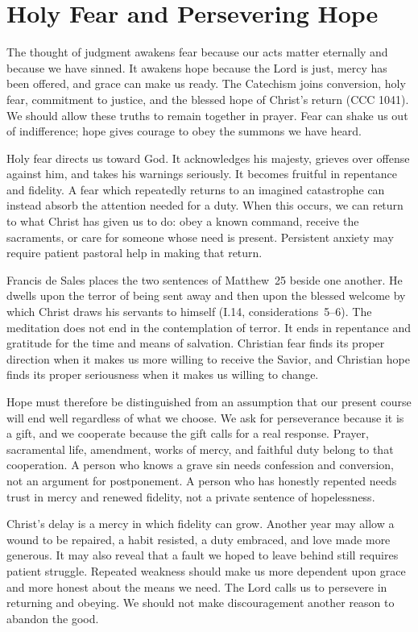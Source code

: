 \section{Holy Fear and Persevering Hope}

The thought of judgment awakens fear because our acts matter eternally and because we have sinned. It awakens hope because the Lord is just, mercy has been offered, and grace can make us ready. The Catechism joins conversion, holy fear, commitment to justice, and the blessed hope of Christ's return (CCC 1041). We should allow these truths to remain together in prayer. Fear can shake us out of indifference; hope gives courage to obey the summons we have heard.

Holy fear directs us toward God. It acknowledges his majesty, grieves over offense against him, and takes his warnings seriously. It becomes fruitful in repentance and fidelity. A fear which repeatedly returns to an imagined catastrophe can instead absorb the attention needed for a duty. When this occurs, we can return to what Christ has given us to do: obey a known command, receive the sacraments, or care for someone whose need is present. Persistent anxiety may require patient pastoral help in making that return.

Francis de Sales places the two sentences of Matthew~25 beside one another. He dwells upon the terror of being sent away and then upon the blessed welcome by which Christ draws his servants to himself (I.14, considerations~5--6). The meditation does not end in the contemplation of terror. It ends in repentance and gratitude for the time and means of salvation. Christian fear finds its proper direction when it makes us more willing to receive the Savior, and Christian hope finds its proper seriousness when it makes us willing to change.

Hope must therefore be distinguished from an assumption that our present course will end well regardless of what we choose. We ask for perseverance because it is a gift, and we cooperate because the gift calls for a real response. Prayer, sacramental life, amendment, works of mercy, and faithful duty belong to that cooperation. A person who knows a grave sin needs confession and conversion, not an argument for postponement. A person who has honestly repented needs trust in mercy and renewed fidelity, not a private sentence of hopelessness.

Christ's delay is a mercy in which fidelity can grow. Another year may allow a wound to be repaired, a habit resisted, a duty embraced, and love made more generous. It may also reveal that a fault we hoped to leave behind still requires patient struggle. Repeated weakness should make us more dependent upon grace and more honest about the means we need. The Lord calls us to persevere in returning and obeying. We should not make discouragement another reason to abandon the good.

